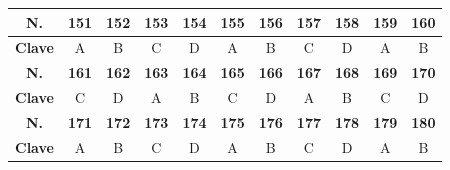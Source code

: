 \begin{center}
\begin{tabular}{|c|c|c|c|c|c|c|c|c|c|c|}
\hline
\textbf{N.} & \textbf{151} & \textbf{152} & \textbf{153} & \textbf{154} & \textbf{155} & \textbf{156} & \textbf{157} & \textbf{158} & \textbf{159} & \textbf{160} \\
\hline
\textbf{Clave} & A & B & C & D & A & B & C & D & A & B \\
\hline
\textbf{N.} & \textbf{161} & \textbf{162} & \textbf{163} & \textbf{164} & \textbf{165} & \textbf{166} & \textbf{167} & \textbf{168} & \textbf{169} & \textbf{170} \\
\hline
\textbf{Clave} & C & D & A & B & C & D & A & B & C & D \\
\hline
\textbf{N.} & \textbf{171} & \textbf{172} & \textbf{173} & \textbf{174} & \textbf{175} & \textbf{176} & \textbf{177} & \textbf{178} & \textbf{179} & \textbf{180} \\
\hline
\textbf{Clave} & A & B & C & D & A & B & C & D & A & B \\
\hline
\end{tabular}
\end{center}
